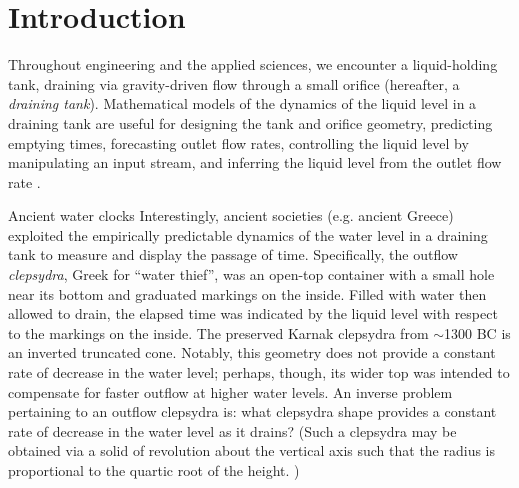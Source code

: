 \documentclass[openacc]{rsproca_new}%
\begin{document}
\rsbreak


\section{Introduction}
Throughout engineering and the applied sciences, we encounter a liquid-holding tank, draining via gravity-driven flow through a small orifice (hereafter, a \emph{draining tank}).
Mathematical models of the dynamics of the liquid level in a draining tank are useful for designing the tank and orifice geometry, predicting emptying times, forecasting outlet flow rates, controlling the liquid level by manipulating an input stream, and inferring the liquid level from the outlet flow rate \cite{d2021torricelli,seborg2016process,groetsch1993inverse,groetsch1999inverse}.

\begin{mytcbox}[label=box:waterclocks, breakable]{Ancient water clocks}
Interestingly, ancient societies (e.g. ancient Greece) exploited the empirically predictable dynamics of the water level in a draining tank to measure and display the passage of time.
Specifically, the outflow \emph{clepsydra}, Greek for ``water thief'', was an open-top container with a small hole near its bottom and graduated markings on the inside. 
Filled with water then allowed to drain, the elapsed time was indicated by the liquid level with respect to the markings on the inside. \cite{bedini1962compartmented,hwang2021historical,ritner2016oriental,hejun1987research,schomberg2018karnak,mills1982newton}
The preserved Karnak clepsydra from $\sim$1300 BC \cite{schomberg2018karnak} is an inverted truncated cone. Notably, this geometry does not provide a constant rate of decrease in the water level; perhaps, though, its wider top was intended to compensate for faster outflow at higher water levels. An inverse problem pertaining to an outflow clepsydra is: what clepsydra shape provides a constant rate of decrease in the water level as it drains?
(Such a clepsydra may be obtained via a solid of revolution about the vertical axis such that the radius is proportional to the quartic root of the height. \cite{mills1982newton,d2021torricelli})
\end{mytcbox}
\end{document}
